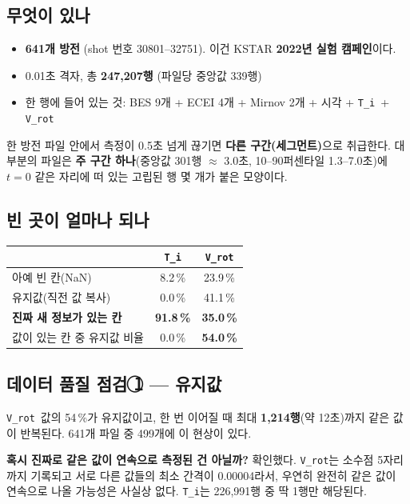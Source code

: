 \documentclass[10pt]{article}
\newcommand{\Ti}{\texttt{T\_i}}
\newcommand{\Vrot}{\texttt{V\_rot}}
\begin{document}
\subsection{무엇이 있나}

\begin{itemize}
\item \textbf{641개 방전} (shot 번호 30801--32751). 이건 KSTAR \textbf{2022년 실험 캠페인}이다.
\item 0.01초 격자, 총 \textbf{247{,}207행} (파일당 중앙값 339행)
\item 한 행에 들어 있는 것: BES 9개 + ECEI 4개 + Mirnov 2개 + 시각 + \Ti\ + \Vrot
\end{itemize}

한 방전 파일 안에서 측정이 0.5초 넘게 끊기면 \textbf{다른 구간(세그먼트)}으로 취급한다.
대부분의 파일은 \textbf{주 구간 하나}(중앙값 301행 $\approx$ 3.0초, 10--90퍼센타일
1.3--7.0초)에 $t=0$ 같은 자리에 떠 있는 고립된 행 몇 개가 붙은 모양이다.

\subsection{빈 곳이 얼마나 되나}

\begin{center}
\begin{tabular}{@{}lcc@{}}
\toprule
 & \Ti & \Vrot \\
\midrule
아예 빈 칸(NaN) & 8.2\,\% & 23.9\,\% \\
유지값(직전 값 복사) & 0.0\,\% & 41.1\,\% \\
\textbf{진짜 새 정보가 있는 칸} & \textbf{91.8\,\%} & \textbf{35.0\,\%} \\
값이 있는 칸 중 유지값 비율 & 0.0\,\% & \textbf{54.0\,\%} \\
\bottomrule
\end{tabular}
\end{center}

\subsection{데이터 품질 점검 \textcircled{1} --- 유지값}

\Vrot\ 값의 54\,\%가 유지값이고, 한 번 이어질 때 최대 \textbf{1{,}214행}(약 12초)까지 같은
값이 반복된다. 641개 파일 중 499개에 이 현상이 있다.

\textbf{혹시 진짜로 같은 값이 연속으로 측정된 건 아닐까?} 확인했다. \Vrot 는 소수점 5자리까지
기록되고 서로 다른 값들의 최소 간격이 0.00004라서, 우연히 완전히 같은 값이 연속으로 나올
가능성은 사실상 없다. \Ti 는 226{,}991행 중 딱 1행만 해당된다.
\end{document}

